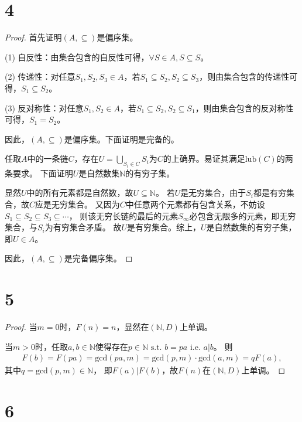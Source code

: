 \documentclass[12pt]{article}
\begin{document}
  \section*{4}

    \begin{proof}
      首先证明$(A,\subseteq)$是偏序集。

      (1) 自反性：由集合包含的自反性可得，$\forall S \in A, S \subseteq S$。

      (2) 传递性：对任意$S_1,S_2,S_3 \in A$，若$S_1 \subseteq S_2, S_2 \subseteq S_3$，则由集合包含的传递性可得，$S_1 \subseteq S_2$。

      (3) 反对称性：对任意$S_1,S_2 \in A$，若$S_1 \subseteq S_2, S_2 \subseteq S_1$，则由集合包含的反对称性可得，$S_1 = S_2$。

      因此，$(A,\subseteq)$是偏序集。下面证明是完备的。

      任取$A$中的一条链$C$，存在$U=\bigcup_{S_i \in C}S_i$为$C$的上确界。易证其满足$\textrm{lub}(C)$的两条要求。
      下面证明$U$是自然数集$\mathbb{N}$的有穷子集。

      显然$U$中的所有元素都是自然数，故$U\subseteq\mathbb{N}$。
      若$U$是无穷集合，由于$S_i$都是有穷集合，故$C$应是无穷集合。
      又因为$C$中任意两个元素都有包含关系，不妨设$S_1 \subseteq S_2 \subseteq S_3 \subseteq \cdots$，
      则该无穷长链的最后的元素$S_\infty$必包含无限多的元素，即无穷集合，与$S_i$为有穷集合矛盾。
      故$U$是有穷集合。综上，$U$是自然数集的有穷子集，即$U \in A$。

      因此，$(A,\subseteq)$是完备偏序集。
    \end{proof}

  \section*{5}

    \begin{proof}
      当$m=0$时，$F(n)=n$，显然在$(\mathbb{N},D)$上单调。

      当$m>0$时，任取$a,b \in \mathbb{N}$使得存在$p\in\mathbb{N}\text{ s.t. }b=pa\text{ i.e. }a|b$。
      则
      \begin{gather*}
        F(b) = F(pa) = \textrm{gcd}(pa,m) = \textrm{gcd}(p,m) \cdot \textrm{gcd}(a,m) = qF(a),
      \end{gather*}
      其中$q=\textrm{gcd}(p,m)\in\mathbb{N}$，
      即$F(a) | F(b)$，故$F(n)$在$(\mathbb{N},D)$上单调。
    \end{proof}

  \section*{6}
\end{document}
